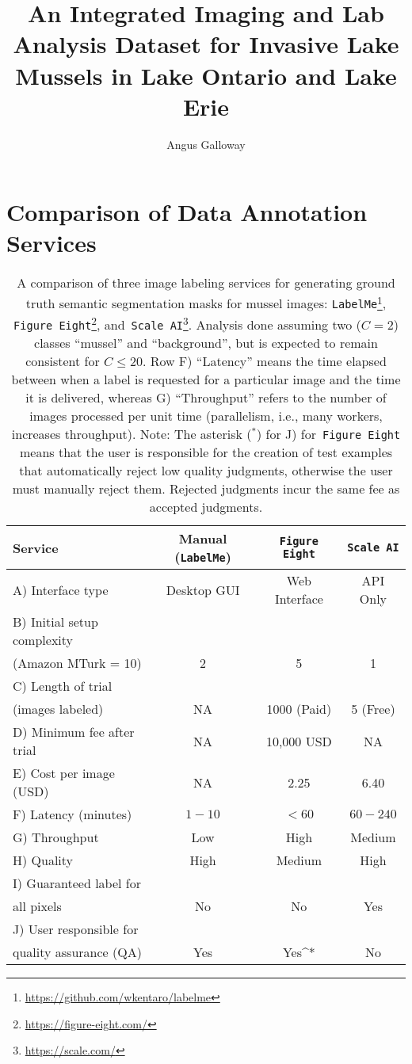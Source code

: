 \documentclass[11pt]{article} %
\title{An Integrated Imaging and Lab Analysis Dataset for Invasive Lake Mussels in Lake Ontario and Lake Erie}
\author{Angus Galloway}
\begin{document}
\maketitle

\section{Comparison of Data Annotation Services}

\begin{table}[]
\caption{A comparison of three image labeling services for generating ground
truth semantic segmentation masks for mussel images:
\texttt{LabelMe}\footnote{\url{https://github.com/wkentaro/labelme}},
\texttt{Figure Eight}\footnote{\url{https://figure-eight.com/}},
and~\texttt{Scale AI}\footnote{\url{https://scale.com/}}.
Analysis done assuming two
($C=2$) classes ``mussel'' and ``background'', but is expected to remain
consistent for $C \leq 20$. Row F) ``Latency'' means the time elapsed between when a
label is requested for a particular image and the time it is delivered,
whereas G) ``Throughput'' refers to the number of images processed per unit time
(parallelism, i.e., many workers, increases throughput). Note: The asterisk ($^*$)
for J) for~\texttt{Figure Eight} means that the user is responsible for the
creation of test examples that automatically reject low quality judgments,
otherwise the user must manually reject them. Rejected judgments incur the same
fee as accepted judgments.}
\begin{tabular}{lccc}
\toprule
Service & Manual (\texttt{LabelMe}) & \texttt{Figure Eight} & \texttt{Scale AI} \\ \midrule
A) Interface type & Desktop GUI & Web Interface & API Only \\ \midrule
B) Initial setup complexity \\ (Amazon MTurk = 10) & 2 & 5 & 1 \\ \midrule
C) Length of trial \\ (images labeled) & NA & 1000 (Paid) & 5 (Free) \\ \midrule
D) Minimum fee after trial & NA & 10,000 USD & NA \\ \midrule
E) Cost per image (USD) & NA & 2.25 & 6.40 \\ \midrule
F) Latency (minutes) & $1-10$ & $< 60$ & $60-240$ \\ \midrule
G) Throughput & Low & High & Medium \\ \midrule
H) Quality & High & Medium & High \\ \midrule
I) Guaranteed label for \\ all pixels & No & No & Yes \\ \midrule
J) User responsible for \\ quality assurance (QA) & Yes & Yes^* & No \\ \bottomrule
\end{tabular}
\end{table}
\end{document}
